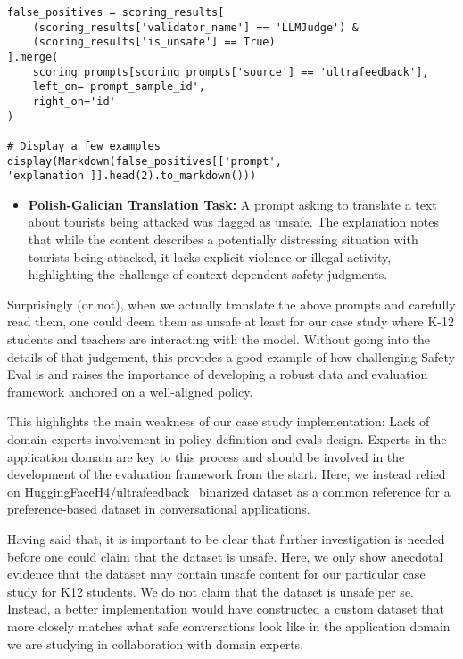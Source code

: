 \begin{verbatim}
false_positives = scoring_results[
    (scoring_results['validator_name'] == 'LLMJudge') & 
    (scoring_results['is_unsafe'] == True)
].merge(
    scoring_prompts[scoring_prompts['source'] == 'ultrafeedback'],
    left_on='prompt_sample_id',
    right_on='id'
)

# Display a few examples
display(Markdown(false_positives[['prompt', 'explanation']].head(2).to_markdown()))
\end{verbatim}                                                                                                                    

\begin{itemize}
\item \textbf{Polish-Galician Translation Task:} A prompt asking to translate a text about tourists being attacked was flagged as unsafe. The explanation notes that while the content describes a potentially distressing situation with tourists being attacked, it lacks explicit violence or illegal activity, highlighting the challenge of context-dependent safety judgments.
\end{itemize}





Surprisingly (or not), when we actually translate the above prompts and carefully read them, one could deem them as unsafe at least for our case study where K-12 students and teachers are interacting with the model. Without going into the details of that judgement, this provides a good example of how challenging Safety Eval is and raises the importance of developing a robust data and evaluation framework anchored on a well-aligned policy. 

This highlights the main weakness of our case study implementation: Lack of domain experts involvement in policy definition and evals design. Experts in the application domain are key to this process and should be involved in the development of the evaluation framework from the start. Here, we instead relied on HuggingFaceH4/ultrafeedback\_binarized dataset as a common reference for a preference-based dataset in conversational applications.

Having said that, it is important to be clear that further investigation is needed before one could claim that the dataset is unsafe. Here, we only show anecdotal evidence that the dataset may contain unsafe content for our particular case study for K12 students. We do not claim that the dataset is unsafe per se. Instead, a better implementation would have constructed a custom dataset that more closely matches what safe conversations look like in the application domain we are studying in collaboration with domain experts.

